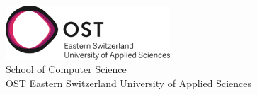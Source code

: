 \begin{titlepage}
\begin{center}
        \vfill

        \includegraphics[height=2cm]{resources/ost-logo.png}\\

        \vspace{1cm}
        School of Computer Science\\
        OST Eastern Switzerland University of Applied Sciences

    \end{center}

\end{titlepage}
